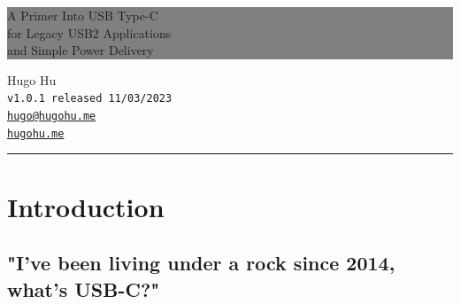 \documentclass[12pt]{article}
\begin{document}
\begin{titlepage} 
	\colorbox{grey}{
		\parbox[t]{0.93\textwidth}{ 
			\parbox[t]{0.91\textwidth}{ 
				\raggedleft 
				\fontsize{50pt}{80pt}\selectfont 
				\vspace{0.7cm} 				
				A Primer Into USB Type-C\\
				for Legacy USB2 Applications\\
				and Simple Power Delivery\\
				
				\vspace{0.7cm} 
			}
		}
	}
	
	\vfill 		
	\parbox[t]{0.93\textwidth}{ 
		\raggedleft 
		\large 
		{\Large Hugo Hu}\\[4pt]
		\texttt{v1.0.1 released 11/03/2023}\\
		\texttt{\href{mailto:hugo@hugohu.me}{hugo@hugohu.me}}\\
		\texttt{\href{https://hugohu.me}{hugohu.me}}\\
		
		\hfill\rule{0.2\linewidth}{1pt}
	}
	
\end{titlepage}


\tableofcontents
\newpage
\section{Introduction}
\subsection{"I've been living under a rock since 2014, what's USB-C?"}
\end{document}
